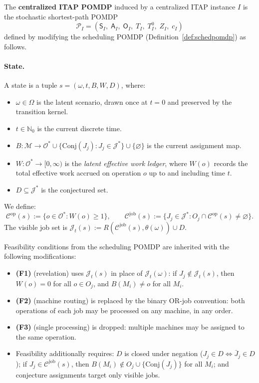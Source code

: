\begin{definition}\label{def:citappomdp}
The \textbf{centralized ITAP POMDP} induced by a centralized ITAP instance $I$ is
the stochastic shortest-path POMDP
\[
\mathcal{P}_I = (\mathsf{S}_I,\; \mathsf{A}_I,\; \mathsf{O}_I,\; T_I,\; T_I^0,\;
Z_I,\; c_I)
\]
defined by modifying the scheduling POMDP (Definition~\ref{def:schedpomdp}) as
follows.
\end{definition}

\paragraph{State.} A state is a tuple $s = (\omega, t, B, W, D)$, where:
\begin{itemize}
    \item $\omega \in \Omega$ is the latent scenario, drawn once at $t = 0$ and
    preserved by the transition kernel.
    \item $t \in \mathbb{N}_0$ is the current discrete time.
    \item $B : \mathcal{M} \to \mathcal{O}^* \cup
    \{\mathrm{Conj}(J_j) : J_j \in \mathcal{J}^*\} \cup \{\varnothing\}$
    is the current assignment map.
    \item $W : \mathcal{O}^* \to [0, \infty)$ is the \emph{latent effective work
    ledger}, where $W(o)$ records the total effective work accrued on operation $o$
    up to and including time $t$.
    \item $D \subseteq \mathcal{J}^*$ is the conjectured set.
\end{itemize}

We define:
\[
\mathcal{C}^{\mathrm{op}}(s) := \{o \in \mathcal{O}^* : W(o) \ge 1\},
\qquad
\mathcal{C}^{\mathrm{job}}(s) := \{J_j \in \mathcal{J}^* :
O_j \cap \mathcal{C}^{\mathrm{op}}(s) \neq \varnothing\}.
\]
The visible job set is
$\mathcal{J}_t(s) := R(\mathcal{C}^{\mathrm{job}}(s), \theta(\omega)) \cup D$.

Feasibility conditions from the scheduling POMDP are inherited with the following
modifications:
\begin{itemize}
    \item \textbf{(F1)} (revelation) uses $\mathcal{J}_t(s)$ in place of
    $\mathcal{J}_t(\omega)$: if $J_j \notin \mathcal{J}_t(s)$, then $W(o) = 0$ for
    all $o \in O_j$, and $B(M_i) \neq o$ for all $M_i$.
    \item \textbf{(F2)} (machine routing) is replaced by the binary OR-job
    convention: both operations of each job may be processed on any machine, in any
    order.
    \item \textbf{(F3)} (single processing) is dropped: multiple machines may be
    assigned to the same operation.
    \item Feasibility additionally requires: $D$ is closed under negation
    ($J_j \in D \iff \bar J_j \in D$); if
    $J_j \in \mathcal{C}^{\mathrm{job}}(s)$, then $B(M_i) \notin O_j \cup
    \{\mathrm{Conj}(J_j)\}$ for all $M_i$; and conjecture assignments target only
    visible jobs.
\end{itemize}

